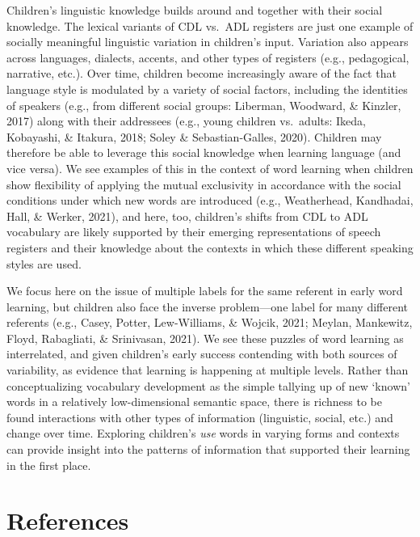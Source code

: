 \documentclass[10pt, letterpaper]{article}
\begin{document}
Children's linguistic knowledge builds around and together with their
social knowledge. The lexical variants of CDL vs.~ADL registers are just
one example of socially meaningful linguistic variation in children's
input. Variation also appears across languages, dialects, accents, and
other types of registers (e.g., pedagogical, narrative, etc.). Over
time, children become increasingly aware of the fact that language style
is modulated by a variety of social factors, including the identities of
speakers (e.g., from different social groups: Liberman, Woodward, \&
Kinzler, 2017) along with their addressees (e.g., young children
vs.~adults: Ikeda, Kobayashi, \& Itakura, 2018; Soley \&
Sebastian-Galles, 2020). Children may therefore be able to leverage this
social knowledge when learning language (and vice versa). We see
examples of this in the context of word learning when children show
flexibility of applying the mutual exclusivity in accordance with the
social conditions under which new words are introduced (e.g.,
Weatherhead, Kandhadai, Hall, \& Werker, 2021), and here, too,
children's shifts from CDL to ADL vocabulary are likely supported by
their emerging representations of speech registers and their knowledge
about the contexts in which these different speaking styles are used.

We focus here on the issue of multiple labels for the same referent in
early word learning, but children also face the inverse problem---one
label for many different referents (e.g., Casey, Potter, Lew-Williams,
\& Wojcik, 2021; Meylan, Mankewitz, Floyd, Rabagliati, \& Srinivasan,
2021). We see these puzzles of word learning as interrelated, and given
children's early success contending with both sources of variability, as
evidence that learning is happening at multiple levels. Rather than
conceptualizing vocabulary development as the simple tallying up of new
`known' words in a relatively low-dimensional semantic space, there is
richness to be found interactions with other types of information
(linguistic, social, etc.) and change over time. Exploring children's
\emph{use} words in varying forms and contexts can provide insight into
the patterns of information that supported their learning in the first
place.

\hypertarget{references}{%
\section{References}\label{references}}

\setlength{\parindent}{-0.1in} 
\setlength{\leftskip}{0.125in}
\end{document}
